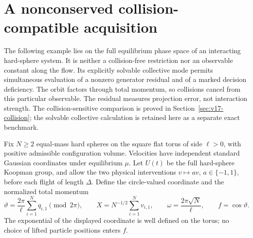 \section{A nonconserved collision-compatible acquisition}
\label{sec:v16-physical}
The following example lies on the full equilibrium phase space of an
interacting hard-sphere system. It is neither a collision-free restriction
nor an observable constant along the flow. Its explicitly solvable
collective mode permits simultaneous evaluation of a nonzero generator
residual and of a marked decision deficiency. The orbit factors through total momentum, so collisions cancel from
this particular observable. The residual measures projection error,
not interaction strength. The collision-sensitive comparison is proved
in Section~\ref{sec:v17-collision}; the solvable collective calculation
is retained here as a separate exact benchmark.

Fix $N\ge2$ equal-mass hard spheres on the square flat torus of side
$\ell>0$, with positive admissible configuration volume. Velocities
have independent standard Gaussian coordinates under equilibrium $\mu$.
Let $U(t)$ be the full hard-sphere Koopman group, and allow the two
physical interventions $v\mapsto av$, $a\in\{-1,1\}$, before each
flight of length $\Delta$. Define the circle-valued coordinate and the
normalized total momentum
\[
 \vartheta=\frac{2\pi}{\ell}\sum_{i=1}^N q_{i,1}\pmod {2\pi},\qquad
 X=N^{-1/2}\sum_{i=1}^N v_{i,1},\qquad
 \omega=\frac{2\pi\sqrt N}{\ell},\qquad f=\cos\vartheta.
\]
The exponential of the displayed coordinate is well defined on the torus;
no choice of lifted particle positions enters $f$.

